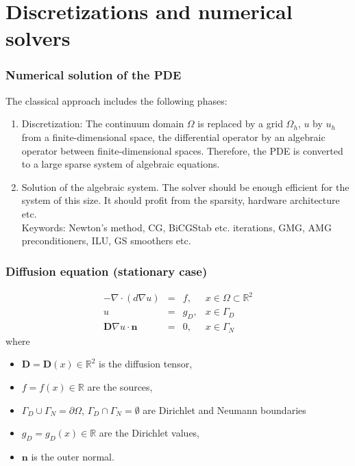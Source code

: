 
\section {Discretizations and numerical solvers}

\begin {frame} [t]
\frametitle {Numerical solution of the PDE}
\vspace {-2ex}
The classical approach includes the following phases:
\begin {enumerate}
	\item {\color{blue}Discretization}: The continuum domain $\Omega$ is replaced by a {\color{blue} grid}
		$\Omega_h$, $u$ by $u_h$ from a finite-dimensional space, the differential
		operator by an algebraic operator between finite-dimensional spaces. Therefore, the
		PDE is converted to a {\color{blue}large sparse system of algebraic equations}. \\
	\pause
	\item Solution of the algebraic system. The {\color{blue} solver} should be enough efficient for the
		system of this size. It should profit from the sparsity, hardware architecture etc. \\
		Keywords: Newton's method, CG, BiCGStab etc. iterations, GMG, AMG preconditioners,
		ILU, GS smoothers etc.
\end {enumerate}
\end {frame}

\begin {frame} [t]
\frametitle {Diffusion equation (stationary case)}
$$
 \begin{array} {rcll}
  - \nabla \cdot (d \nabla u) & = & f, & x \in \Omega \subset \mathbb{R}^2 \\
  u & = & g_D, & x \in \Gamma_D \\
  \mathbf{D} \nabla u \cdot \mathbf{n} & = & 0, & x \in \Gamma_N 
 \end{array}
$$
where
\begin {itemize}
	\item $\mathbf{D} = \mathbf{D} (x) \in \mathbb{R}^2$ is the diffusion tensor,
	\item $f = f (x) \in \mathbb{R}$ are the sources,
	\item $\Gamma_D \cup \Gamma_N = \partial \Omega$, $\Gamma_D \cap \Gamma_N = \emptyset$
		are Dirichlet and Neumann boundaries
	\item $g_D = g_D (x) \in \mathbb{R}$ are the Dirichlet values,
	\item $\mathbf{n}$ is the outer normal.
\end {itemize}
\end {frame}

